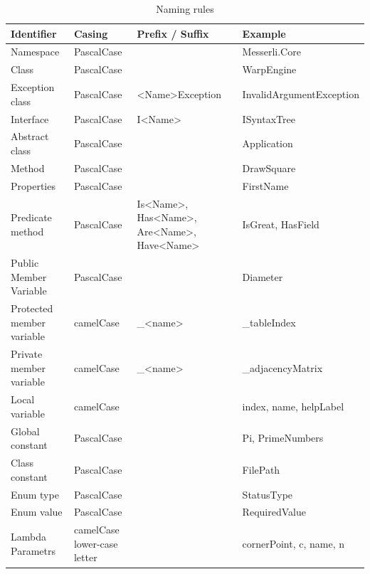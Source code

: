 \documentclass[11pt,a4paper]{article}
\begin{document}
\begin{table}
\centering
\begin{tabular}{lp{20mm}p{25mm}l}
 \textbf{Identifier} & \textbf{Casing} & \textbf{Prefix / Suffix} & \textbf{Example} \\
  \hline
 Namespace                 & PascalCase &                 & Messerli.Core            \\
  \hline
 Class                     & PascalCase &                 & WarpEngine               \\
  \hline
 Exception class           & PascalCase & <Name>Exception & InvalidArgumentException \\ 
  \hline
 Interface                 & PascalCase & I<Name>         & ISyntaxTree              \\
  \hline
 Abstract class            & PascalCase &                 & Application              \\
  \hline
 Method                    & PascalCase &                 & DrawSquare               \\
  \hline
 Properties                & PascalCase &                 & FirstName                \\
  \hline
 Predicate method          & PascalCase & Is<Name>, Has<Name>, Are<Name>, Have<Name> & IsGreat, HasField \\
  \hline
 Public Member Variable    & PascalCase &                 & Diameter                 \\
  \hline
 Protected member variable & camelCase  & \_<name>        & \_tableIndex             \\
  \hline
 Private member variable   & camelCase  & \_<name>        & \_adjacencyMatrix        \\
  \hline
 Local variable            & camelCase  &                 & index, name, helpLabel   \\
  \hline
 Global constant           & PascalCase &                 & Pi, PrimeNumbers         \\
  \hline
 Class constant            & PascalCase &                 & FilePath                 \\
  \hline
 Enum type                 & PascalCase &                 & StatusType               \\
  \hline
 Enum value                & PascalCase &                 & RequiredValue            \\
  \hline
 Lambda Parametrs          & camelCase \newline lower-case letter  & & cornerPoint, c, name, n    \\
\end{tabular}
\caption{Naming rules}
\label{naming_identifiers}
\end{table}
\end{document}
